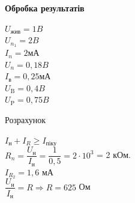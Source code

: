 \documentclass[a4paper,14pt]{extreport}
\begin{document}
\begin{center}
\textbf{Обробка результатів}
\end{center}
\begin{minipage}{0.35\textwidth}
\begin{tcolorbox}[ title=\textbf{Дано (варіант 13)}]
$U_{\text{жив}}= 1 B$\\
$U_{n_1}= 2 B$\\
$I_n = 2 \text{мА}$\\
$U_{n}= 0,18 B$\\
$I_{\text{в}} = 0,25 \text{мА}$\\
$U_{\text{B}}= 0,4 B$\\
$U_{\text{P}}= 0,75 B$\\
\end{tcolorbox}
\end{minipage}
\hfill
\begin{minipage}{0.6\textwidth}
\begin{center}Розрахунок\end{center}
$I_{\text{н}} + I_{R} \ge I_{\text{піку}}$\\

$R_{n} = \dfrac{U_{\text{н}}}{I_{\text{н}}} = \dfrac{1}{0,5} = 2\cdot 10^{3}$ = 2 кОм.\\

$I_{R_2} = 1,6 $ мА\\

$\dfrac{U_{\text{н}}}{I_{\text{н}}} = R \Rightarrow R = 625 $ Ом



\end{minipage}
\end{document}
